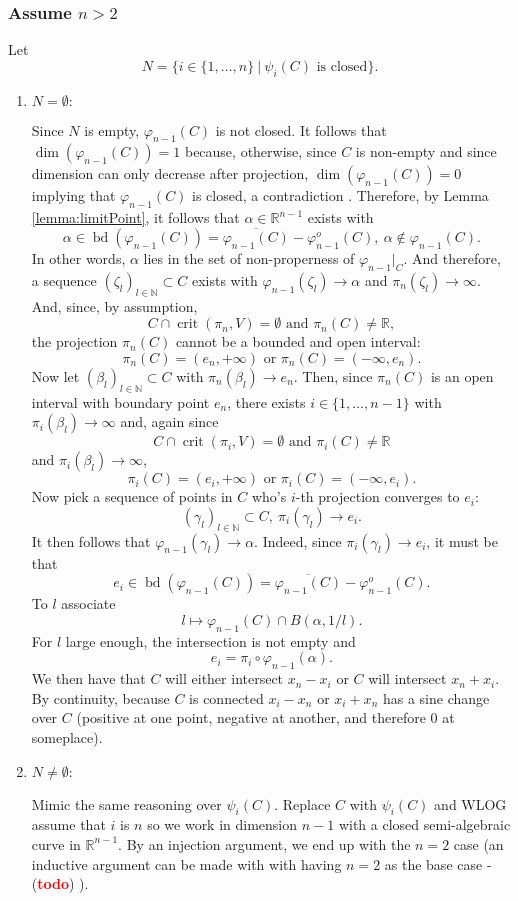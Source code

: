\documentclass[11pt]{article}
\theoremstyle{definition}
\newcommand{\N}{\mathbb{N}}
\newcommand{\R}{\mathbb{R}}
\newcommand{\vp}{\varphi}
\def\td{(\textcolor{red}{{\bf todo}})}
\def\td{(\textcolor{red}{{\bf todo}}) }
\DeclareMathOperator{\bd}{bd}
\DeclareMathOperator{\crit}{crit}
\begin{document}
\subsubsection*{Assume $n>2$}
Let 
\[
N = \big\{i \in \{1,\hdots,n\} ~|~ \psi_i(C) \textrm{ is closed}\big\}. 
\]
\begin{enumerate}
    \item $N = \emptyset:$ 
    \par 
    Since $N$ is empty, $\vp_{n-1}(C)$ is not closed. It follows that $\dim(\vp_{n-1}(C))=1$ because, otherwise, since $C$ is non-empty  and since dimension can only decrease after projection, $\dim(\vp_{n-1}(C))=0$ implying that $\vp_{n-1}(C)$ is closed, a contradiction \lightning. Therefore, by Lemma \ref{lemma:limitPoint}, it follows that $\alpha \in \R^{n-1}$ exists with 
    \[
    \alpha \in \bd(\vp_{n-1}(C)) = \overline{\vp_{n-1}(C)} - \vp_{n-1}^o(C),~ \alpha \not \in \vp_{n-1}(C).
    \]
    In other words, $\alpha$ lies in the set of non-properness of $\vp_{n-1}|_C$. And therefore, a sequence $(\zeta_l)_{l \in \N} \subset C$ exists with $\vp_{n-1}(\zeta_l) \rightarrow \alpha$ and $\pi_n(\zeta_l) \rightarrow \infty.$ And, since, by assumption, 
\[
    C \cap \crit(\pi_n,V) = \emptyset \textrm{ and  } \pi_n(C) \not = \R,
\]
the projection $\pi_n(C)$ cannot be a bounded and open interval:
\[
\pi_n(C) = (e_n,+\infty) \textrm{ or } \pi_n(C) = (-\infty,e_n). 
\]
Now let $(\beta_l)_{l \in \N} \subset C$ with $\pi_n(\beta_l) \rightarrow e_n$. Then, since $\pi_n(C)$ is an open interval with boundary point $e_n$, there exists $i \in \{1,\hdots,n-1\}$ with $\pi_i(\beta_l) \rightarrow \infty$ and, again since \[
    C \cap \crit(\pi_i,V) = \emptyset \textrm{ and  } \pi_i(C) \not = \R
\]
and $\pi_i(\beta_l) \rightarrow \infty$,
\[
\pi_i(C) = (e_i,+\infty) \textrm{ or } \pi_i(C) = (-\infty,e_i). 
\]
Now pick a sequence of points in $C$ who's $i$-th projection converges to $e_i:$ 
\[
(\gamma_l)_{l \in \N} \subset C,~ \pi_i(\gamma_l) \rightarrow e_i.
\]
It then follows that $\vp_{n-1}(\gamma_l) \rightarrow \alpha$. Indeed, since $\pi_i(\gamma_l) \rightarrow e_i$, it must be that 
\[
e_i \in \bd(\vp_{n-1}(C)) = \overline{\vp_{n-1}(C)} - \vp_{n-1}^o(C).
\]
To $l$ associate 
\[
l \mapsto \vp_{n-1}(C) \cap B(\alpha,1/l).
\]
For $l$ large enough, the intersection is not empty and
\[
e_i =\pi_i\circ \vp_{n-1}(\alpha).
\]
We then have that $C$ will either intersect $x_n-x_i$ or $C$ will intersect $x_n+x_i$. By continuity, because $C$ is connected $x_i - x_n$ or $x_i+x_n$ has a sine change over $C$ (positive at one point, negative at another, and therefore 0 at someplace). 
%
\item $N \not = \emptyset:$
\par 
Mimic the same reasoning over $\psi_i(C)$. Replace $C$ with $\psi_i(C)$ and WLOG assume that $i$ is $n$ so we work in dimension $n-1$ with a closed semi-algebraic curve in $\R^{n-1}$. By an injection argument, we end up with the $n=2$ case (an inductive argument can be made with with having $n=2$ as the base case - \td).  
\end{enumerate}
\end{document}

